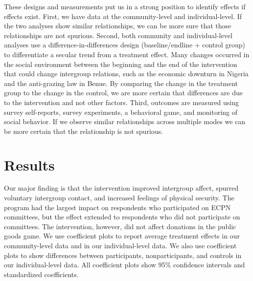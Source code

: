 \documentclass[11pt]{article}
\begin{document}
These designs and measurements put us in a strong position to identify
effects if effects exist. First, we have data at the community-level and
individual-level. If the two analyses show similar relationships, we can
be more sure that those relationships are not spurious. Second, both
community and individual-level analyses use a difference-in-differences
design (baseline/endline + control group) to differentiate a secular
trend from a treatment effect. Many changes occurred in the social
environment between the beginning and the end of the intervention that
could change intergroup relations, such as the economic downturn in
Nigeria and the anti-grazing law in Benue. By comparing the change in
the treatment group to the change in the control, we are more certain
that differences are due to the intervention and not other factors.
Third, outcomes are measured using survey self-reports, survey
experiments, a behavioral game, and monitoring of social behavior. If we
observe similar relationships across multiple modes we can be more
certain that the relationship is not spurious.

\hypertarget{results}{%
\section{Results}\label{results}}

Our major finding is that the intervention improved intergroup affect,
spurred voluntary intergroup contact, and increased feelings of physical
security. The program had the largest impact on respondents who
participated on ECPN committees, but the effect extended to respondents
who did not participate on committees. The intervention, however, did
not affect donations in the public goods game. We use coefficient plots
to report average treatment effects in our community-level data and in
our individual-level data. We also use coefficient plots to show
differences between participants, nonparticipants, and controls in our
individual-level data. All coefficient plots show 95\% confidence
intervals and standardized coefficients.
\end{document}
